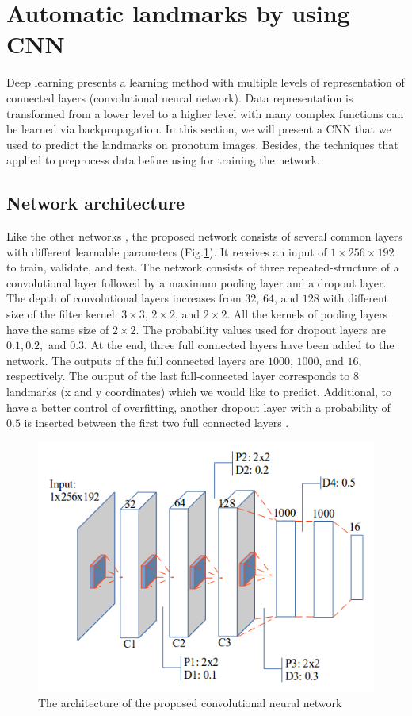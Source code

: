 \documentclass[10pt]{article}
\begin{document}
\section{Automatic landmarks by using CNN}
Deep learning presents a learning method with multiple levels of representation of connected layers (convolutional neural network). Data representation is transformed from a lower level to a higher level with many complex functions can be learned via backpropagation. In this section, we will present a CNN that we used to predict the landmarks on pronotum images. Besides, the techniques that applied to preprocess data before using for training the network.
\subsection{Network architecture}
Like the other networks \cite{lecun2010convolutional, li2015convolutional, cintas2016automatic}, the proposed network consists of several common layers with different learnable parameters (Fig.\ref{cnnnetwork}). It receives an input of $1 \times 256 \times 192$ to train, validate, and test. The network consists of three repeated-structure of a convolutional layer followed by a maximum pooling layer and a dropout layer. The depth
of convolutional layers increases from $32$, $64$, and $128$ with
different size of the filter kernel: $3 \times 3$, $2 \times 2$, and $2 \times 2$.
All the kernels of pooling layers have the same size of $2 \times 2$. The probability values used for dropout layers are $0.1, 0.2,$ and $0.3$.
At the end, three full connected layers have been added to the
network. The outputs of the full connected layers are $1000$, $1000$,
and $16$, respectively. The output of the last full-connected
layer corresponds to 8 landmarks (x and y coordinates) which
we would like to predict. Additional, to have a better control of overfitting, another dropout layer with a probability of $0.5$ is inserted between the first two full connected layers \cite{srivastava2014dropout}.

\begin{figure}[htbp]
\centering
\includegraphics[scale=0.5]{images/architecture3}
\caption{The architecture of the proposed convolutional neural network} 
\label{cnnnetwork}
\end{figure}
\end{document}
